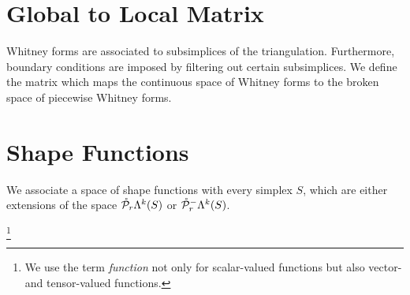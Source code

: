 \documentclass[letterpaper,10pt,draft]{amsart}
\begin{document}
\section{Global to Local Matrix}

Whitney forms are associated to subsimplices of the triangulation. 
Furthermore, boundary conditions are imposed by filtering out certain subsimplices.
We define the matrix which maps the continuous space of Whitney forms
to the broken space of piecewise Whitney forms.



\section{Shape Functions}

We associate a space of shape functions with every simplex $S$,
which are either extensions of the space $\mathring{{\mathcal P}}_{r}\Lambda^{k}(S)$
or $\mathring{{\mathcal P}}_{r}^{-}\Lambda^{k}(S)$.

\footnote{We use the term \textit{function} not only for scalar-valued functions
but also vector- and tensor-valued functions.}




  
  

  
\end{document}
